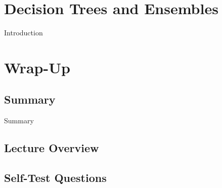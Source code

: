 \begin{frame}{}{}

\end{frame}


\section{Decision Trees and Ensembles}

\begin{frame}{Introduction}{}
\end{frame}



\section{Wrap-Up}

\subsection{Summary}

\begin{frame}{Summary}{}

\end{frame}


\subsection{Lecture Overview}



\subsection{Self-Test Questions}

